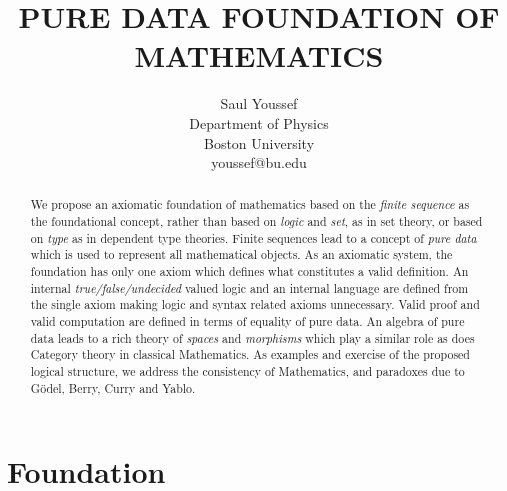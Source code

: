 \documentclass[11pt]{article}
\begin{document}
\title{\bf {PURE DATA FOUNDATION OF MATHEMATICS}}
\author{%
  Saul Youssef%
  \hfil \\
  Department of Physics \\
  Boston University \\
  youssef@bu.edu\\
}
\maketitle
\begin{abstract}
We propose an axiomatic foundation of mathematics based on the {\it finite sequence} as the foundational concept, rather than based 
on {\it logic} and {\it set}, as in set theory, or based on {\it type} as in dependent type theories.  Finite sequences lead to a concept of {\it pure data} which is
used to represent all mathematical objects.  As an axiomatic system, the foundation has only one axiom which
defines what constitutes a valid definition.  An internal {\it true/false/undecided} valued logic and an internal language are defined from the single axiom
making logic and syntax related axioms unnecessary.  Valid proof and valid computation are defined in terms of equality of pure data.  An algebra of pure data
leads to a rich theory of {\it spaces} and {\it morphisms} which play a similar role as does Category theory in classical Mathematics.  As examples and
exercise of the proposed logical structure, we address the consistency of Mathematics, and paradoxes due to G\"odel, Berry, Curry and Yablo.
\end{abstract}

\section{Foundation}
\end{document}
